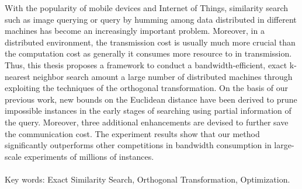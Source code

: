 \begin{abstractEN}

With the popularity of mobile devices and Internet of Things, similarity search such as image querying or query by humming among data distributed in different machines has become an increasingly important problem.  Moreover, in a distributed environment, the transmission cost is usually much more crucial than the computation cost as generally it consumes more resource to in transmission.  Thus, this thesis proposes a framework to conduct a bandwidth-efficient, exact k-nearest neighbor search amount a large number of distributed machines through exploiting the techniques of the orthogonal transformation.  On the basis of our previous work, new bounds on the Euclidean distance have been derived to prune impossible instances in the early stages of searching using partial information of the query.  Moreover, three additional enhancements are devised to further save the communication cost.  The experiment results show that our method significantly outperforms other competitions in bandwidth consumption in large-scale experiments of millions of instances.
\\ \\
Key words: Exact Similarity Search, Orthogonal Transformation, Optimization.

\end{abstractEN}
